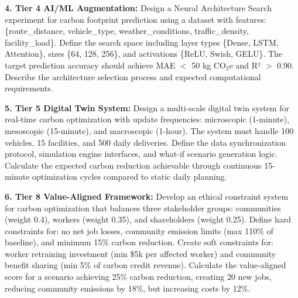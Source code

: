 \documentclass{article}
\begin{document}
\textbf{4. Tier 4 AI/ML Augmentation:} Design a Neural Architecture Search experiment for carbon footprint prediction using a dataset with features: \{route\_distance, vehicle\_type, weather\_conditions, traffic\_density, facility\_load\}. Define the search space including layer types \{Dense, LSTM, Attention\}, sizes \{64, 128, 256\}, and activations \{ReLU, Swish, GELU\}. The target prediction accuracy should achieve MAE $<$ 50 kg CO$_2$e and R² $>$ 0.90. Describe the architecture selection process and expected computational requirements.

\textbf{5. Tier 5 Digital Twin System:} Design a multi-scale digital twin system for real-time carbon optimization with update frequencies: microscopic (1-minute), mesoscopic (15-minute), and macroscopic (1-hour). The system must handle 100 vehicles, 15 facilities, and 500 daily deliveries. Define the data synchronization protocol, simulation engine interfaces, and what-if scenario generation logic. Calculate the expected carbon reduction achievable through continuous 15-minute optimization cycles compared to static daily planning.

\textbf{6. Tier 8 Value-Aligned Framework:} Develop an ethical constraint system for carbon optimization that balances three stakeholder groups: communities (weight 0.4), workers (weight 0.35), and shareholders (weight 0.25). Define hard constraints for: no net job losses, community emission limits (max 110\% of baseline), and minimum 15\% carbon reduction. Create soft constraints for: worker retraining investment (min \$5k per affected worker) and community benefit sharing (min 5\% of carbon credit revenue). Calculate the value-aligned score for a scenario achieving 25\% carbon reduction, creating 20 new jobs, reducing community emissions by 18\%, but increasing costs by 12\%.
\end{document}
